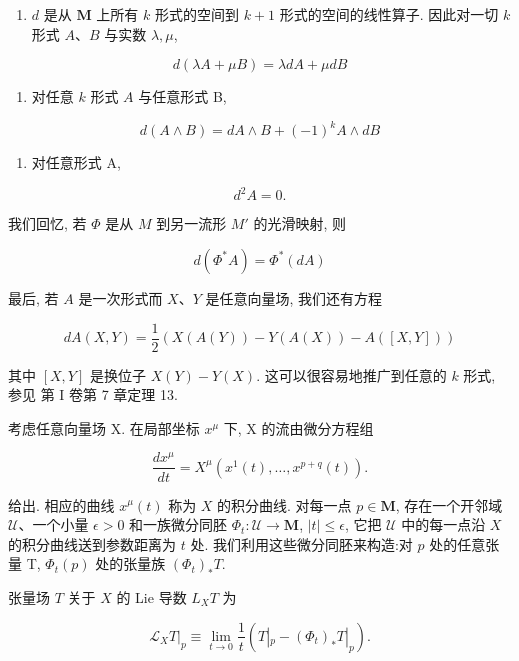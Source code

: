 \begin{enumerate}
\renewcommand{\labelenumi}{\roman{enumi})}
\item $d$ 是从 $\mathbf{M}$ 上所有 $k$ 形式的空间到 $k+1$ 形式的空间的线性算子. 因此对一切 $k$ 形式 $A$、$B$ 与实数 $\lambda, \mu$,
\end{enumerate}

\[
d(\lambda A + \mu B) = \lambda dA + \mu dB
\]

\begin{enumerate}
\renewcommand{\labelenumi}{\roman{enumi})}
\setcounter{enumi}{1}
\item 对任意 $k$ 形式 $A$ 与任意形式 B,
\end{enumerate}

\[
d(A \wedge B) = dA \wedge B + (-1)^{k} A \wedge dB
\]

\begin{enumerate}
\renewcommand{\labelenumi}{\roman{enumi})}
\setcounter{enumi}{2}
\item 对任意形式 A,
\end{enumerate}

\[
d^{2}A = 0.
\]

我们回忆, 若 $\Phi$ 是从 $M$ 到另一流形 $M'$ 的光滑映射, 则

\[
d(\Phi^{*}A) = \Phi^{*}(dA)
\]

最后, 若 $A$ 是一次形式而 $X$、$Y$ 是任意向量场, 我们还有方程

\[
dA(X, Y) = \frac{1}{2}\left(X(A(Y)) - Y(A(X)) - A([X, Y])\right)
\]

其中 $[X, Y]$ 是换位子 $X(Y)-Y(X)$. 这可以很容易地推广到任意的 $k$ 形式, 参见 \emph{\cite{sp}} 第 I 卷第 7 章定理 13.


考虑任意向量场 X. 在局部坐标 $x^{\mu}$ 下, X 的流由微分方程组

\[
\frac{dx^{\mu}}{dt} = X^{\mu}(x^{1}(t), \dots, x^{p+q}(t)).
\]

给出. 相应的曲线 $x^{\mu}(t)$ 称为 $X$ 的积分曲线. 对每一点 $p \in \mathbf{M}$, 存在一个开邻域 $\mathcal{U}$、一个小量 $\epsilon > 0$ 和一族微分同胚 $\Phi_t: \mathcal{U} \to \mathbf{M}$, $|t| \leq \epsilon$, 它把 $\mathcal{U}$ 中的每一点沿 $X$ 的积分曲线送到参数距离为 $t$ 处. 我们利用这些微分同胚来构造:对 $p$ 处的任意张量 T, $\Phi_t(p)$ 处的张量族 $(\Phi_t)_*T$.

张量场 $T$ 关于 $X$ 的 Lie 导数 $L_{X}T$ 为

\[
\mathcal{L}_{X}T|_{p} \equiv \lim_{t \to 0} \frac{1}{t}\left(T|_{p} - (\Phi_{t})_{*}T|_{p}\right).
\]

